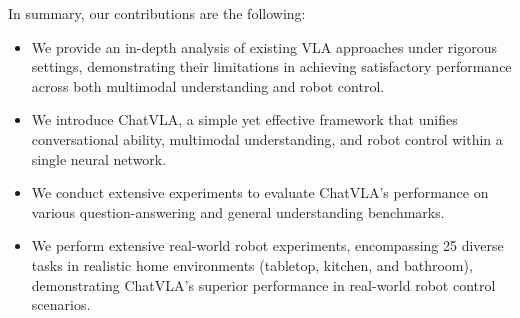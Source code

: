 In summary, our contributions are the following:
\begin{itemize}
    \item We provide an in-depth analysis of existing VLA approaches under rigorous settings, demonstrating their limitations in achieving satisfactory performance across both multimodal understanding and robot control.
    \item We introduce ChatVLA, a simple yet effective framework that unifies conversational ability, multimodal understanding, and robot control within a single neural network.
    \item We conduct extensive experiments to evaluate ChatVLA's performance on various question-answering and general understanding benchmarks. 
    \item We perform extensive real-world robot experiments, encompassing 25 diverse tasks in realistic home environments (tabletop, kitchen, and bathroom), demonstrating ChatVLA's superior performance in real-world robot control scenarios.
\end{itemize}

